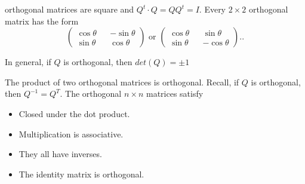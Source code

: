 orthogonal matrices are square and $Q^{t}\cdot Q=Q Q^{t}=I$. Every $2\times 2$ orthogonal matrix has the form 
\[
  \begin{pmatrix} \cos\theta&&-\sin \theta\\ \sin \theta && \cos \theta \end{pmatrix} \text{ or } \begin{pmatrix} \cos\theta&& \sin \theta\\ \sin \theta && -\cos\theta \end{pmatrix} .
.\] 

In general, if $Q$ is orthogonal, then $det(Q)=\pm 1$

\begin{theorem}
  The product of two orthogonal matrices is orthogonal.
  Recall, if $Q$ is orthogonal, then $Q^{-1}=Q^{T}$. The orthogonal $n\times n$ matrices satisfy 
  \begin{itemize}
    \item Closed under the dot product.
    \item Multiplication is associative.
    \item They all have inverses.
    \item The identity matrix is orthogonal.
  \end{itemize}

\end{theorem}
